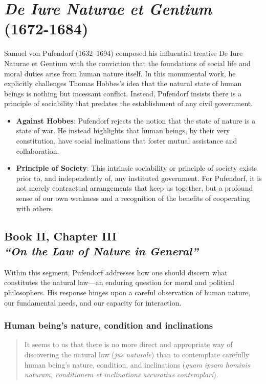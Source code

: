 \section{\textit{De Iure Naturae et Gentium} (1672-1684)}

    Samuel von Pufendorf (1632–1694) composed his influential treatise De Iure Naturae et Gentium with the conviction that the foundations of social life and moral duties arise from human nature itself. In this monumental work, he explicitly challenges Thomas Hobbes’s idea that the natural state of human beings is nothing but incessant conflict. Instead, Pufendorf insists there is a principle of sociability that predates the establishment of any civil government.

    \begin{itemize}
        \item \textbf{Against Hobbes}: Pufendorf rejects the notion that the state of nature is a state of war. He instead highlights that human beings, by their very constitution, have social inclinations that foster mutual assistance and collaboration.
        \item \textbf{Principle of Society}: This intrinsic sociability or principle of society exists prior to, and independently of, any instituted government. For Pufendorf, it is not merely contractual arrangements that keep us together, but a profound sense of our own weakness and a recognition of the benefits of cooperating with others.
    \end{itemize}

    \subsection[On the Law of Nature in General]{Book II, Chapter III\\ 
                \textit{“On the Law of Nature in General”}}

        Within this segment, Pufendorf addresses how one should discern what constitutes the natural law—an enduring question for moral and political philosophers. His response hinges upon a careful observation of human nature, our fundamental needs, and our capacity for interaction.

        \subsubsection{Human being’s nature, condition and inclinations}

            \begin{quote}
                It seems to us that there is no more direct and appropriate way of discovering the natural law (\textit{jus naturale}) than to contemplate carefully human being’s nature, condition, and inclinations (\textit{quam ipsam hominis naturam, conditionem et inclinations accuratius contemplari}).
            \end{quote}

